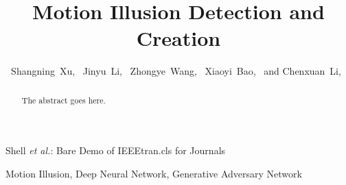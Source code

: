 \documentclass[journal]{IEEEtran}
\begin{document}
  \title{Motion Illusion Detection and Creation}
  
  \author{
    Shangning~Xu,~
    Jinyu~Li,~
    Zhongye~Wang,~
    Xiaoyi~Bao,~
    and Chenxuan~Li,~
  }
  
  {Shell \MakeLowercase{\textit{et al.}}: Bare Demo of IEEEtran.cls for Journals}
  
  
  \maketitle
  
  \begin{abstract}
  The abstract goes here.
  \end{abstract}
  
  \begin{IEEEkeywords}
  Motion Illusion, Deep Neural Network, Generative Adversary Network
  \end{IEEEkeywords}
  
\end{document}
